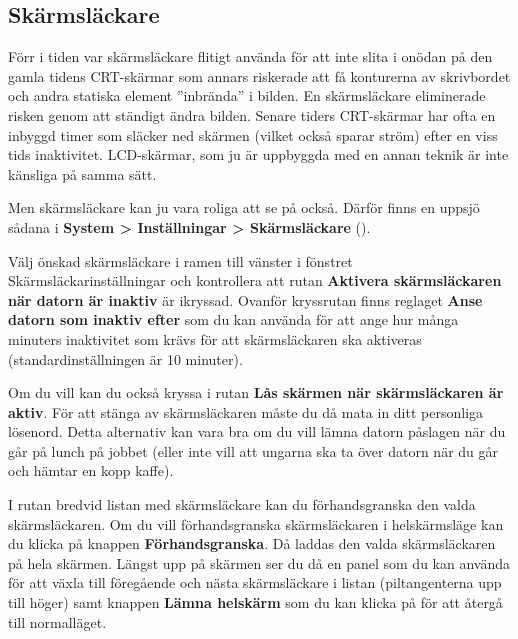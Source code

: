 \documentclass[a4paper,final]{memoir} %
\begin{document}

\subsection{Skärmsläckare}


Förr i tiden var skärmsläckare flitigt använda för att inte slita i onödan på den gamla tidens CRT-skärmar som annars riskerade att få konturerna av skrivbordet och andra statiska element ''inbrända'' i bilden. En skärmsläckare eliminerade risken genom att ständigt ändra bilden. Senare tiders CRT-skärmar har ofta en inbyggd timer som släcker ned skärmen (vilket också sparar ström) efter en viss tids inaktivitet. LCD-skärmar, som ju är uppbyggda med en annan teknik är inte känsliga på samma sätt.

Men skärmsläckare kan ju vara roliga att se på också. Därför finns en uppsjö sådana i \textbf{System \textgreater{} Inställningar \textgreater{} Skärmsläckare} ().


Välj önskad skärmsläckare i ramen till vänster i fönstret Skärmsläckarinställningar och kontrollera att rutan \textbf{Aktivera skärmsläckaren när datorn är inaktiv} är ikryssad. Ovanför kryssrutan finns reglaget \textbf{Anse datorn som inaktiv efter} som du kan använda för att ange hur många minuters inaktivitet som krävs för att skärmsläckaren ska aktiveras (standardinställningen är 10 minuter).

Om du vill kan du också kryssa i rutan \textbf{Lås skärmen när skärmsläckaren är aktiv}. För att stänga av skärmsläckaren måste du då mata in ditt personliga lösenord. Detta alternativ kan vara bra om du vill lämna datorn påslagen när du går på lunch på jobbet (eller inte vill att ungarna ska ta över datorn när du går och hämtar en kopp kaffe). 

I rutan bredvid listan med skärmsläckare kan du förhandsgranska den valda skärmsläckaren. Om du vill förhandsgranska skärmsläckaren i helskärmsläge kan du klicka på knappen \textbf{Förhandsgranska}. Då laddas den valda skärmsläckaren på hela skärmen. Längst upp på skärmen ser du då en panel som du kan använda för att växla till föregående och nästa skärmsläckare i listan (piltangenterna upp till höger) samt knappen \textbf{Lämna helskärm} som du kan klicka på för att återgå till normalläget.
\end{document}
